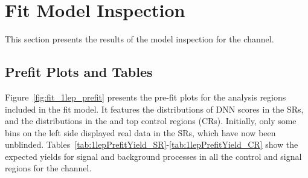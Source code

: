 \clearpage
\section{Fit Model Inspection}
\label{sec:fit_1lep}
This section presents the results of the model inspection for the \olep channel.

\subsection{Prefit Plots and Tables}
Figure~\ref{fig:fit_1lep_prefit} presents the pre-fit plots for the analysis regions included in the fit model. It features the distributions of DNN scores in the SRs, and the \mjjtag distributions in the \Wjets and top control regions (CRs). Initially, only some bins on the left side displayed real data in the SRs, which have now been unblinded.
Tables~\ref{tab:1lepPrefitYield_SR}-\ref{tab:1lepPrefitYield_CR} show the expected yields for signal and background processes in all the control and signal regions for the \olep channel.

